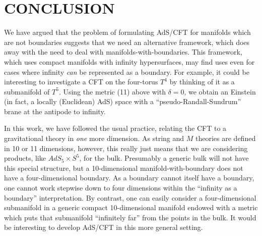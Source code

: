 \documentclass[a4paper,12pt]{article}
\theoremstyle{definition}
\renewcommand{\u}{\textit}
\renewcommand{\-}{$\dfrac{\quad\enspace}{\quad}$}
\begin{document}
\section{\large CONCLUSION}

We have argued that the problem of formulating AdS/CFT for manifolds which are not boundaries suggests that we need an alternative framework, which does away with the need to deal with manifolds-with-boundaries. This framework, which uses compact manifolds with infinity hypersurfaces, may find uses even for cases where infinity \u{can} be represented as a boundary. For example, it could be interesting to investigate a CFT on the four-torus $T^4$ by thinking of it as a submanifold of $T^5$. Using the metric (11) above with $\delta=0$, we obtain an Einstein (in fact, a locally (Euclidean) AdS) space with a ``pseudo-Randall-Sundrum'' brane at the antipode to infinity.

In this work, we have followed the usual practice, relating the CFT to a gravitational theory in \u{one} more dimension. As string and $M$ theories are defined in 10 or 11 dimensions, however, this really just means that we are considering products, like $AdS_5\times S^5$, for the bulk. Presumably a generic bulk will not have this special structure, but a 10-dimensional manifold-with-boundary does not have a four-dimensional boundary. As a boundary cannot itself have a boundary, one cannot work stepwise down to four dimensions within the ``infinity as a boundary'' interpretation. By contrast, one can easily consider a four-dimensional submanifold in a generic compact 10-dimensional manifold endowed with a metric which puts that submanifold ``infinitely far'' from the points in the bulk. It would be interesting to develop AdS/CFT in this more general setting.
\end{document}
